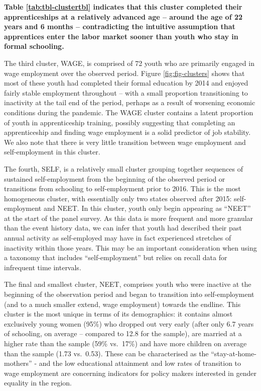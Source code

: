 \documentclass[
  11pt,
a4paper
]{article}
\begin{document}
\textbf{Table \ref{tab:tbl-clustertbl} indicates that this cluster completed their apprenticeships at a relatively advanced age -- around the age of 22 years and 6 months -- contradicting the intuitive assumption that apprentices enter the labor market sooner than youth who stay in formal schooling.}

The third cluster, WAGE, is comprised of 72 youth who are primarily engaged in wage employment over the observed period. Figure \ref{fig:fig-clusters} shows that most of these youth had completed their formal education by 2014 and enjoyed fairly stable employment throughout -- with a small proportion transitioning to inactivity at the tail end of the period, perhaps as a result of worsening economic conditions during the pandemic. The WAGE cluster contains a latent proportion of youth in apprenticeship training, possibly suggesting that completing an apprenticeship and finding wage employment is a solid predictor of job stability. We also note that there is very little transition between wage employment and self-employment in this cluster.

The fourth, SELF, is a relatively small cluster grouping together sequences of sustained self-employment from the beginning of the observed period or transitions from schooling to self-employment prior to 2016. This is the most homogeneous cluster, with essentially only two states observed after 2015: self-employment and NEET. In this cluster, youth only begin appearing as ``NEET'' at the start of the panel survey. As this data is more frequent and more granular than the event history data, we can infer that youth had described their past annual activity as self-employed may have in fact experienced stretches of inactivity within those years. This may be an important consideration when using a taxonomy that includes ``self-employment'' but relies on recall data for infrequent time intervals.

The final and smallest cluster, NEET, comprises youth who were inactive at the beginning of the observation period and began to transition into self-employment (and to a much smaller extend, wage employment) towards the endline. This cluster is the most unique in terms of its demographics: it contains almost exclusively young women (95\%) who dropped out very early (after only 6.7 years of schooling, on average -- compared to 12.8 for the sample), are married at a higher rate than the sample (59\% vs.~17\%) and have more children on average than the sample (1.73 vs.~0.53). These can be characterised as the ``stay-at-home-mothers'' - and the low educational attainment and low rates of transition to wage employment are concerning indicators for policy makers interested in gender equality in the region.
\end{document}
